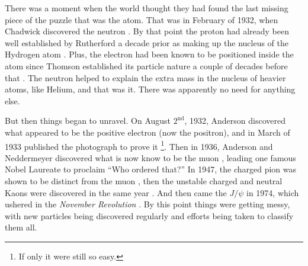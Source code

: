 There was a moment when the world thought they 
had found the last missing piece of the puzzle 
that was the atom.
That was in February of 1932, when Chadwick discovered the
neutron \cite{Chadwick:1932ma}. By that point the proton had already been 
well established by Rutherford a decade prior as 
making up the nucleus of the Hydrogen
atom \cite{Rutherford:1911zz}. 
Plus, the electron had been known to be positioned inside the atom
since Thomson established its particle nature a couple of decades before
that \cite{thompson:electron}. 
The neutron helped to explain the extra mass in the nucleus of heavier
atoms, like Helium, and that was it. 
There was apparently no need for anything else. 


But then things began to unravel. On August $2^{\textrm{nd}}$, 1932, Anderson
discovered what appeared to be the positive electron (now the positron), 
and in March of 1933 published 
the photograph to prove it \cite{PhysRev.43.491}\footnote{If only it were still so easy.}. 
Then in 1936, Anderson and Neddermeyer discovered
what is now know to be the muon \cite{PhysRev.51.884}, 
leading one famous Nobel Laureate
to proclaim ``Who ordered that?'' 
In 1947, the charged pion was shown to be distinct 
from the muon \cite{Lattes:1947my},
then the unstable
charged and neutral Kaons were discovered in the 
same year \cite{Rochester:1947mi}.
And then came the $J/\psi$ in 1974, which ushered in the \emph{November Revolution} \cite{PhysRevLett.33.1404,PhysRevLett.33.1453}.  
By this point things were getting messy, with new particles being discovered regularly and efforts being taken to classify them all.


